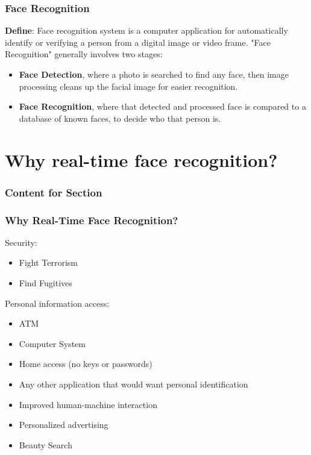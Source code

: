 \documentclass[xcolor=dvipsnames]{beamer}
\begin{document}
    \begin{frame}
    \frametitle{Face Recognition}
    \textbf{Define}: Face recognition system is a computer application for automatically identify or verifying a person from a digital image or video frame.\newline \newline
    "Face Recognition" generally involves two stages:
    \begin{itemize}
    \item \textbf{Face Detection}, where a photo is searched to find any face, then image processing cleans up the facial image for easier recognition.
    \item \textbf{Face Recognition}, where that detected and processed face is compared to a database of known faces, to decide who that person is.
    \end{itemize}
    \end{frame}


    \section{Why real-time face recognition?}
    \begin{frame}
      \frametitle{Content for Section \thesection}
      \tableofcontents[currentsection]
    \end{frame}

    \begin{frame}
    \frametitle{Why Real-Time Face Recognition?}
    
    \begin{block}{Security:}
    \begin{itemize}
    \item Fight Terrorism
    \item Find Fugitives
    \end{itemize}
    \end{block}
    
    \begin{block}{Personal information access:}
    \begin{itemize}
    \item ATM
    \item Computer System
    \item Home access (no keys or passwords)
    \item Any other application that would want personal identification
    \end{itemize}
    \end{block}
    
    \begin{itemize}
    \item Improved human-machine interaction
    \item Personalized advertising
    \item Beauty Search
    \end{itemize}
    \end{frame}
\end{document}
